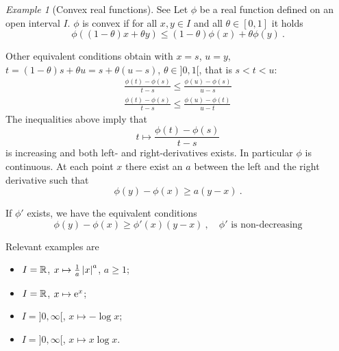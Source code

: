 \documentclass[12pt,a4paper]{amsart}
\theoremstyle{plain}%
\theoremstyle{definition}
\theoremstyle{remark}
\newtheorem{example}{Example}
\begin{document}
\begin{example}[Convex real functions] See
  \cite[p.~61--65]{rudin:1987-3rd}
Let $\phi$ be a real function defined on an open interval $I$. $\phi$ is
convex if for all $x,y \in I$ and all $\theta \in [0,1]$ it holds
\begin{equation*}
  \phi((1-\theta)x + \theta y) \leq (1-\theta)\phi(x) + \theta \phi(y) \ .
\end{equation*}

Other equivalent conditions obtain with $x=s$,
$u=y$, $t = (1-\theta)s + \theta u = s + \theta (u-s)$, $\theta \in
]0,1[$, that is $s
< t < u$: 
\begin{gather*}
  \frac{\phi(t)-\phi(s)}{t-s} \leq \frac{\phi(u)-\phi(s)}{u-s}  \\
    \frac{\phi(t)-\phi(s)}{t-s} \leq \frac{\phi(u)-\phi(t)}{u-t} 
\end{gather*}
The inequalities above imply that
\begin{equation*}
  t \mapsto \frac{\phi(t)-\phi(s)}{t-s}
\end{equation*}
is increasing and both left- and right-derivatives exists. In
particular $\phi$ is continuous. At each point $x$ there exist an $a$
between the left and the right derivative such that
\begin{equation*}
  \phi(y) - \phi(x) \geq a (y-x) \ .
\end{equation*}

If $\phi'$ exists, we have the equivalent conditions
\begin{equation*}
  \phi(y) - \phi(x) \geq \phi'(x)(y-x) \ , \quad \text{$\phi'$ is non-decreasing}
\end{equation*}

Relevant examples are
\begin{itemize}
\item  $I = \mathbb{R}$, $x \mapsto \frac1a \left\vert x\right\vert ^ a$, $a \geq 1$;
  \item
  $I = \mathbb{R}$, $x \mapsto \mathrm{e}^x$;
\item $I = ]0,\infty[$, $x \mapsto - \log x$;
\item $I = ]0,\infty[$, $x \mapsto x \log x$.
\end{itemize}


\end{example}
\end{document}

